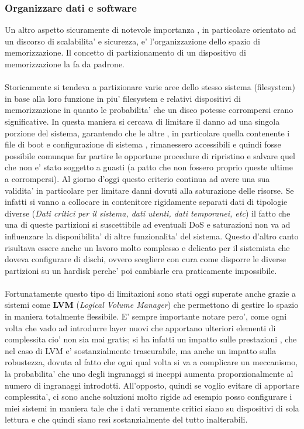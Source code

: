 \subsubsection{Organizzare dati e software}
Un altro aspetto sicuramente di notevole importanza , in particolare orientato ad un discorso di scalabilita' e sicurezza, e' l'organizzazione dello spazio di memorizzazione. Il concetto di partizionamento di un dispositivo di memorizzazione la fa da padrone. 
\\\\
Storicamente si tendeva a partizionare varie aree dello stesso sistema (filesystem) in base alla loro funzione in piu' filesystem e relativi dispositivi di memorizzazione in quanto le probabilita' che un disco potesse corrompersi erano significative. In questa maniera si cercava di limitare il danno ad una singola porzione del sistema, garantendo che le altre , in particolare quella contenente i file di boot e configurazione di sistema , rimanessero accessibili e quindi fosse possibile comunque far partire le opportune procedure di ripristino e salvare quel che non e' stato soggetto a guasti (a patto che non fossero proprio queste ultime a corrompersi). Al giorno d'oggi questo criterio continua ad avere una sua validita' in particolare per limitare danni dovuti alla saturazione delle risorse. Se infatti si vanno a collocare in contenitore rigidamente separati dati di tipologie diverse (\emph{Dati critici per il sistema, dati utenti, dati temporanei, etc}) il fatto che una di queste partizioni si suscettibile ad eventuali DoS e saturazioni non va ad influenzare la disponibilita' di altre funzionalita' del sistema. Questo d'altro canto risultava essere anche un lavoro molto complesso e delicato per il sistemista che doveva configurare di dischi, ovvero scegliere con cura come disporre le diverse partizioni su un hardisk perche' poi cambiarle era praticamente impossibile. 
\\\\
Fortunatamente questo tipo di limitazioni sono stati oggi superate anche grazie a sistemi come \textbf{LVM} (\emph{Logical Volume Manager}) che permettono di gestire lo spazio in maniera totalmente flessibile. E' sempre importante notare pero', come ogni volta che vado ad introdurre layer nuovi che apportano ulteriori elementi di complessita cio' non sia mai gratis; si ha infatti un impatto sulle prestazioni , che nel caso di LVM e' sostanzialmente trascurabile, ma anche un impatto sulla robustezza, dovuta al fatto che ogni qual volta si va a complicare un meccanismo, la probabilita' che uno degli ingranaggi si inceppi aumenta proporzionalmente al numero di ingranaggi introdotti. All'opposto, quindi se voglio evitare di apportare complessita', ci sono anche soluzioni molto rigide ad esempio posso configurare i miei sistemi in maniera tale che i dati veramente critici siano su dispositivi di sola lettura e che quindi siano resi sostanzialmente del tutto inalterabili.

